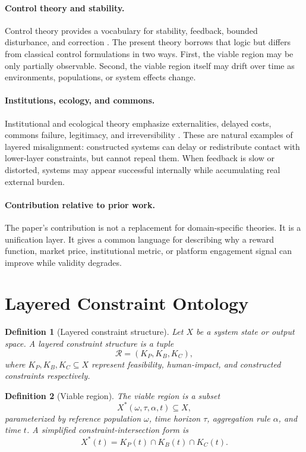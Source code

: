 \documentclass[11pt]{article}
\newtheorem{definition}{Definition}[section]
\newcommand{\KP}{K_P}
\newcommand{\KB}{K_B}
\newcommand{\KC}{K_C}
\newcommand{\Xstar}{X^{\ast}}
\newcommand{\R}{\mathcal{R}}
\begin{document}
\paragraph{Control theory and stability.} Control theory provides a vocabulary for stability, feedback, bounded disturbance, and correction \cite{khalil2002nonlinear}. The present theory borrows that logic but differs from classical control formulations in two ways. First, the viable region may be only partially observable. Second, the viable region itself may drift over time as environments, populations, or system effects change.

\paragraph{Institutions, ecology, and commons.} Institutional and ecological theory emphasize externalities, delayed costs, commons failure, legitimacy, and irreversibility \cite{ostrom1990governing}. These are natural examples of layered misalignment: constructed systems can delay or redistribute contact with lower-layer constraints, but cannot repeal them. When feedback is slow or distorted, systems may appear successful internally while accumulating real external burden.

\paragraph{Contribution relative to prior work.} The paper's contribution is not a replacement for domain-specific theories. It is a unification layer. It gives a common language for describing why a reward function, market price, institutional metric, or platform engagement signal can improve while validity degrades.

\section{Layered Constraint Ontology}

\begin{definition}[Layered constraint structure]
Let \(X\) be a system state or output space. A layered constraint structure is a tuple
\[
\R = (\KP,\KB,\KC),
\]
where \(\KP,\KB,\KC\subseteq X\) represent feasibility, human-impact, and constructed constraints respectively.
\end{definition}

\begin{definition}[Viable region]
The viable region is a subset
\[
\Xstar(\omega,\tau,\alpha,t) \subseteq X,
\]
parameterized by reference population \(\omega\), time horizon \(\tau\), aggregation rule \(\alpha\), and time \(t\). A simplified constraint-intersection form is
\[
\Xstar(t) = \KP(t)\cap\KB(t)\cap\KC(t).
\]
\end{definition}
\end{document}
